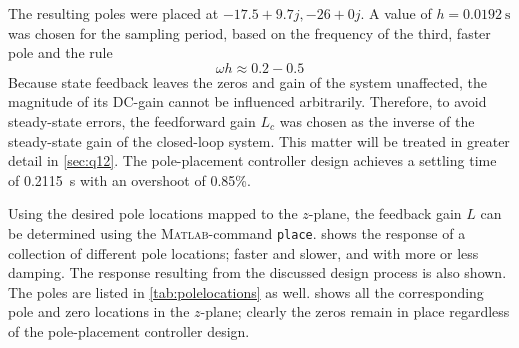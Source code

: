 The resulting poles were placed at $-17.5 + 9.7j, -26 + 0j$. A value of $h = \SI{0.0192}{\second}$ was chosen for the sampling period, based on the frequency of the third, faster pole and the rule \cite{astrom}
    $$ \omega h \approx 0.2-0.5 $$
Because state feedback leaves the zeros and gain of the system unaffected, the magnitude of its DC-gain cannot be influenced arbitrarily. Therefore, to avoid steady-state errors, the feedforward gain $L_c$ was chosen as the inverse of the steady-state gain of the closed-loop system. This matter will be treated in greater detail in \cref{sec:q12}.
The pole-placement controller design achieves a settling time of \SI{0.2115}{\second} with an overshoot of 0.85\%.

Using the desired pole locations mapped to the $z$-plane, the feedback gain $L$ can be determined using the \textsc{Matlab}-command \texttt{place}.  shows the response of a collection of different pole locations; faster and slower, and with more or less damping. The response resulting from the discussed design process is also shown. The poles are listed in \cref{tab:polelocations} as well.  shows all the corresponding pole and zero locations in the $z$-plane; clearly the zeros remain in place regardless of the pole-placement controller design.
